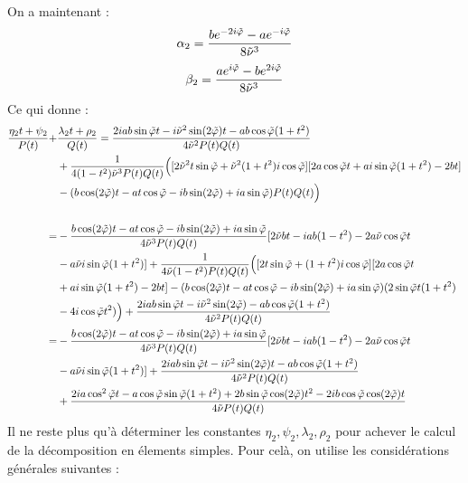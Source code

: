 On a maintenant :
$$\alpha_2=\frac{be^{-2i\tilde{\varphi}}-ae^{-i\tilde{\varphi}}}{8\tilde{\nu}^3}$$
$$\beta_2=\frac{ae^{i\tilde{\varphi}}-be^{2i\tilde{\varphi}}}{8\tilde{\nu}^3}$$
Ce qui donne :
\begin{equation}
\begin{split}
\frac{\eta_2 t+\psi_2}{P(t)}+&\frac{\lambda_2 t +\rho_2}{Q(t)}
=\frac{2iab\sin\tilde{\varphi}t-i\tilde{\nu}^2\sin(2\tilde{\varphi})t-ab\cos\tilde{\varphi}(1+t^2)}{4\tilde{\nu}^2P(t)Q(t)}\\
&+\frac{1}{4(1-t^2)\tilde{\nu}^3P(t)Q(t)}\Big( \lbrack 2\tilde{\nu}^2t\sin\tilde{\varphi}+\tilde{\nu}^2(1+t^2)i\cos\tilde{\varphi} \rbrack\lbrack2a\cos\tilde{\varphi}t+ai\sin\tilde{\varphi}(1+t^2)-2bt \rbrack\\
&-(b\cos(2\tilde{\varphi})t-at\cos\tilde{\varphi}-ib\sin(2\tilde{\varphi})+ia\sin\tilde{\varphi})P(t)Q(t)\Big) \\
~\\
=&-\frac{b\cos(2\tilde{\varphi})t-at\cos\tilde{\varphi}-ib\sin(2\tilde{\varphi})+ia\sin\tilde{\varphi}}{4\tilde{\nu}^3P(t)Q(t)}\lbrack 2\tilde{\nu} bt-iab(1-t^2)-2a\tilde{\nu}\cos\tilde{\varphi}t\\
&-a\tilde{\nu} i\sin\tilde{\varphi}(1+t^2)\rbrack +\frac{1}{4\tilde{\nu}(1-t^2)P(t)Q(t)}\Big( \lbrack 2t\sin\tilde{\varphi}+(1+t^2)i\cos\tilde{\varphi} \rbrack\lbrack 2a\cos\tilde{\varphi}t\\
&+ai\sin\tilde{\varphi}(1+t^2)-2bt \rbrack- (b\cos(2\tilde{\varphi})t-at\cos\tilde{\varphi}-ib\sin(2\tilde{\varphi})+ia\sin\tilde{\varphi})(2\sin\tilde{\varphi}t(1+t^2)\\
&-4i\cos\tilde{\varphi}t^2) \Big)+\frac{2iab\sin\tilde{\varphi}t-i\tilde{\nu}^2\sin(2\tilde{\varphi})-ab\cos\tilde{\varphi}(1+t^2)}{4\tilde{\nu}^2P(t)Q(t)}\\
=&-\frac{b\cos(2\tilde{\varphi})t-at\cos\tilde{\varphi}-ib\sin(2\tilde{\varphi})+ia\sin\tilde{\varphi}}{4\tilde{\nu}^3P(t)Q(t)}\lbrack 2\tilde{\nu} bt-iab(1-t^2)-2a\tilde{\nu}\cos\tilde{\varphi}t\\
&-a\tilde{\nu} i\sin\tilde{\varphi}(1+t^2)\rbrack+\frac{2iab\sin\tilde{\varphi}t-i\tilde{\nu}^2\sin(2\tilde{\varphi})t-ab\cos\tilde{\varphi}(1+t^2)}{4\tilde{\nu}^2P(t)Q(t)}\\
&+\frac{2ia\cos^2\tilde{\varphi}t-a\cos\tilde{\varphi}\sin\tilde{\varphi}(1+t^2)+2b\sin\tilde{\varphi}\cos(2\tilde{\varphi})t^2-2ib\cos\tilde{\varphi}\cos(2\tilde{\varphi})t}{4\tilde{\nu} P(t)Q(t)}
\end{split}
\label{N2}
\end{equation}
Il ne reste plus qu'à déterminer les constantes $\eta_2,\psi_2,\lambda_2,\rho_2$ pour achever le calcul de la décomposition en élements simples. Pour celà, on utilise les considérations générales suivantes :
